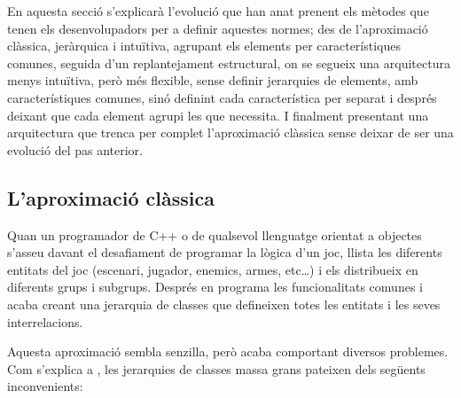  En aquesta secció s'explicarà l'evolució que han anat prenent els mètodes que tenen els desenvolupadors per a definir aquestes normes; des de l'aproximació clàssica, jeràrquica i intuïtiva, agrupant els elements per característiques comunes, seguida d'un replantejament estructural, on se segueix una arquitectura menys intuïtiva, però més flexible, sense definir jerarquies de elements, amb característiques comunes, sinó definint cada característica per separat i després deixant que cada element agrupi les que necessita. I finalment presentant una arquitectura que trenca per complet l'aproximació clàssica sense deixar de ser una evolució del pas anterior.

\subsection{L'aproximació clàssica}

Quan un programador de {C++} o de qualsevol llenguatge orientat a objectes s'asseu davant el desafiament de programar la lògica d'un joc, llista les diferents entitats del joc (escenari, jugador, enemics, armes, etc\ldots) i els distribueix en diferents grups i subgrups. Després en programa les funcionalitats comunes i acaba creant una jerarquia de classes que defineixen totes les entitats i les seves interrelacions. 

Aquesta aproximació sembla senzilla, però acaba comportant diversos problemes. Com s'explica a \citep[p.~719]{Gregory09}, les jerarquies de classes massa grans pateixen dels següents inconvenients:





